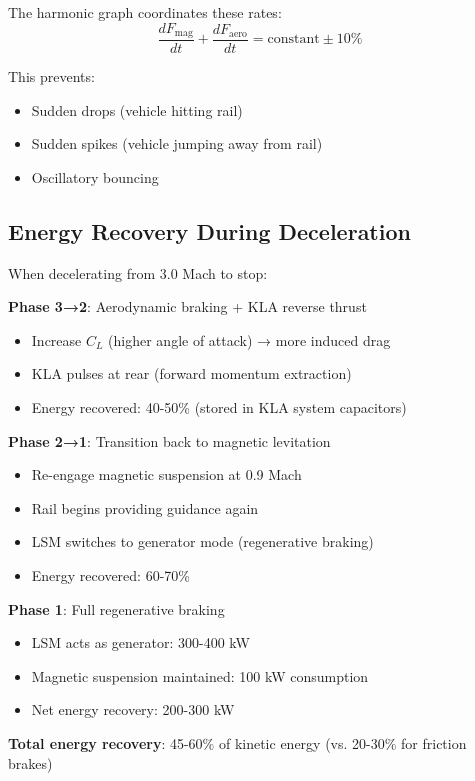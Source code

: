 \documentclass[12pt,a4paper]{article}
\begin{document}
The harmonic graph coordinates these rates:
\begin{equation}
\frac{dF_{\text{mag}}}{dt} + \frac{dF_{\text{aero}}}{dt} = \text{constant} \pm 10\%
\end{equation}

This prevents:
\begin{itemize}
\item Sudden drops (vehicle hitting rail)
\item Sudden spikes (vehicle jumping away from rail)
\item Oscillatory bouncing
\end{itemize}

\subsection{Energy Recovery During Deceleration}

When decelerating from 3.0 Mach to stop:

\textbf{Phase 3→2}: Aerodynamic braking + KLA reverse thrust
\begin{itemize}
\item Increase $C_L$ (higher angle of attack) → more induced drag
\item KLA pulses at rear (forward momentum extraction)
\item Energy recovered: 40-50\% (stored in KLA system capacitors)
\end{itemize}

\textbf{Phase 2→1}: Transition back to magnetic levitation
\begin{itemize}
\item Re-engage magnetic suspension at 0.9 Mach
\item Rail begins providing guidance again
\item LSM switches to generator mode (regenerative braking)
\item Energy recovered: 60-70\%
\end{itemize}

\textbf{Phase 1}: Full regenerative braking
\begin{itemize}
\item LSM acts as generator: 300-400 kW
\item Magnetic suspension maintained: 100 kW consumption
\item Net energy recovery: 200-300 kW
\end{itemize}

\textbf{Total energy recovery}: 45-60\% of kinetic energy (vs. 20-30\% for friction brakes)
\end{document}
